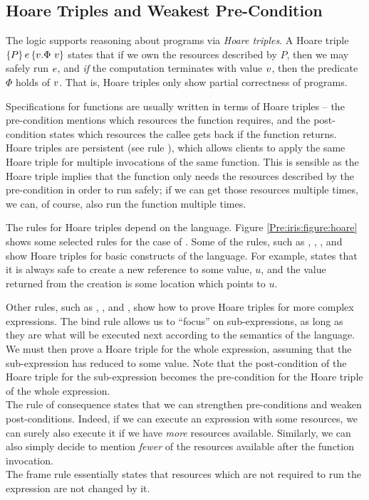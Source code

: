 \documentclass[a4paper, 10pt]{report}
\theoremstyle{definition}
\begin{document}
\subsection{Hoare Triples and Weakest Pre-Condition}
\label{Pre:iris:sub:ht-and-wp}

The logic supports reasoning about programs via \textit{Hoare triples}. A Hoare triple $\hoare{P}{\expr}{\val . \Phi ~ \val}$ states that if we own the resources described by $P$, then we may safely run $e$, and \emph{if} the computation terminates with value $v$, then the predicate $\Phi$ holds of $v$. That is, Hoare triples only show partial correctness of programs.

Specifications for functions are usually written in terms of Hoare triples -- the pre-condition mentions which resources the function requires, and the post-condition states which resources the callee gets back if the function returns. Hoare triples are persistent (see rule ), which allows clients to apply the same Hoare triple for multiple invocations of the same function. This is sensible as the Hoare triple implies that the function only needs the resources described by the pre-condition in order to run safely; if we can get those resources multiple times, we can, of course, also run the function multiple times.

The rules for Hoare triples depend on the language. Figure \ref{Pre:iris:figure:hoare} shows some selected rules for the case of \heaplang{}. Some of the rules, such as , , , and  show Hoare triples for basic constructs of the language. For example,  states that it is always safe to create a new reference to some value, $u$, and the value returned from the creation is some location which points to $u$.

Other rules, such as , , and , show how to prove Hoare triples for more complex expressions. The bind rule allows us to ``focus'' on sub-expressions, as long as they are what will be executed next according to the semantics of the language. We must then prove a Hoare triple for the whole expression, assuming that the sub-expression has reduced to some value. Note that the post-condition of the Hoare triple for the sub-expression becomes the pre-condition for the Hoare triple of the whole expression.\\
The rule of consequence states that we can strengthen pre-conditions and weaken post-conditions. Indeed, if we can execute an expression with some resources, we can surely also execute it if we have \emph{more} resources available. Similarly, we can also simply decide to mention \emph{fewer} of the resources available after the function invocation.\\
The frame rule essentially states that resources which are not required to run the expression are not changed by it.
\end{document}
